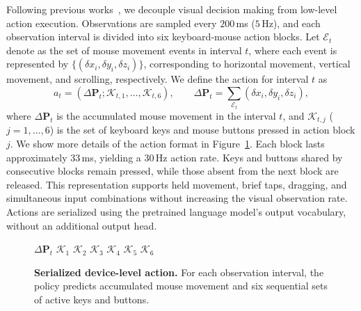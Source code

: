 Following previous works~\cite{tan2025lumine,wang2025gametars}, we decouple visual decision making from low-level action execution. Observations are sampled every $200$\,ms ($5$\,Hz), and each observation interval is divided into six keyboard-mouse action blocks. Let $\mathcal{E}_t$ denote as the set of mouse movement events in interval $t$, where each event is represented by $\{ (\delta x_i,\delta y_i,\delta z_i)\}$, corresponding to horizontal movement, vertical movement, and scrolling, respectively. We define the action for interval $t$ as
\begin{equation}
a_t=\left(\Delta\mathbf{P}_t;\mathcal{K}_{t,1},\ldots,\mathcal{K}_{t,6}\right),
\qquad
\Delta\mathbf{P}_t=\sum_{\mathcal{E}_t}(\delta x_i,\delta y_i,\delta z_i),
\label{eq:action_representation}
\end{equation}
where $\Delta\mathbf{P}_t$ is the accumulated mouse movement in the interval $t$, and $\mathcal{K}_{t,j}$ ($j=1,\dots,6$) is the set of keyboard keys and mouse buttons pressed in action block $j$. We show more details of the action format in Figure~\ref{fig:action_format}. Each block lasts approximately $33$\,ms, yielding a $30$\,Hz action rate. Keys and buttons shared by consecutive blocks remain pressed, while those absent from the next block are released. This representation supports held movement, brief taps, dragging, and simultaneous input combinations without increasing the visual observation rate. Actions are serialized using the pretrained language model's output vocabulary, without an additional output head.

\begin{figure}[t]
    \centering
    \begin{tcolorbox}[
        enhanced,
        width=0.96\linewidth,
        colback=gray!6,
        colframe=black!65,
        boxrule=0.5pt,
        arc=1.2mm,
        left=3mm,right=3mm,top=4mm,bottom=3mm,
        title={Unified Keyboard-Mouse Action Serialization},
        fonttitle=\bfseries\normalsize,
        coltitle=white,colbacktitle=black!85
    ]
    \centering
    \normalsize\ttfamily
    $\Delta \mathbf{P}_t$
    \detokenize{;}
    $\mathcal{K}_1$
    \detokenize{;}
    $\mathcal{K}_2$
    \detokenize{;}
    $\mathcal{K}_3$
    \detokenize{;}
    $\mathcal{K}_4$
    \detokenize{;}
    $\mathcal{K}_5$
    \detokenize{;}
    $\mathcal{K}_6$
    \end{tcolorbox}
    \caption{\textbf{Serialized device-level action.} For each observation interval, the policy predicts accumulated mouse movement and six sequential sets of active keys and buttons.}
    \label{fig:action_format}
\end{figure}

